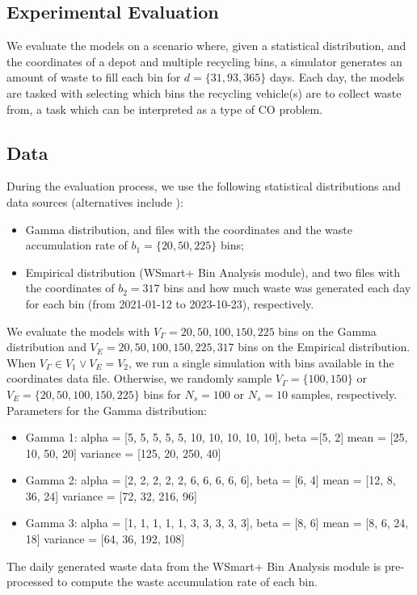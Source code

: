 \documentclass[orivec,runningheads]{llncs}
\begin{document}
\begin{center}
\begin{longtable}
\section{Experimental Evaluation}
We evaluate the models on a scenario where, given a statistical distribution, and the coordinates of a depot and multiple recycling bins, a simulator generates an amount of waste to fill each bin for ${d=\{31, 93, 365\}}$ days. Each day, the models are tasked with selecting which bins the recycling vehicle(s) are to collect waste from, a task which can be interpreted as a type of CO problem.

\subsection{Data}
During the evaluation process, we use the following statistical distributions and data sources (alternatives include \cite{brouwer2023comparison}):
\begin{itemize}
    \item Gamma distribution, and files with the coordinates and the waste accumulation rate of ${b_1=\{20, 50, 225\}}$ bins;
    \item Empirical distribution (WSmart+ Bin Analysis module), and two files with the coordinates of $b_2={317}$ bins and how much waste was generated each day for each bin (from 2021-01-12 to 2023-10-23), respectively.
\end{itemize}
We evaluate the models with ${V_{\Gamma}=20, 50, 100, 150, 225}$ bins on the Gamma distribution and ${V_{E}=20, 50, 100, 150, 225, 317}$ bins on the Empirical distribution. When $V_{\Gamma} \in V_1 \lor V_{E}=V_2$, we run a single simulation with bins available in the coordinates data file. Otherwise, we randomly sample $V_{\Gamma} = \{100, 150\}$ or $V_{E} = \{20, 50, 100, 150, 225\}$ bins for $N_s=100$ or $N_s=10$ samples, respectively.\\
Parameters for the Gamma distribution:
\begin{itemize}
    \item Gamma 1: alpha = [5, 5, 5, 5, 5, 10, 10, 10, 10, 10], beta =[5, 2]
        \subitem mean = [25, 10, 50, 20]
        \subitem variance = [125, 20, 250, 40]
    \item Gamma 2: alpha = [2, 2, 2, 2, 2, 6, 6, 6, 6, 6], beta = [6, 4]
        \subitem mean = [12, 8, 36, 24]
        \subitem variance = [72, 32, 216, 96]
    \item Gamma 3: alpha = [1, 1, 1, 1, 1, 3, 3, 3, 3, 3], beta = [8, 6]
        \subitem mean = [8, 6, 24, 18]
        \subitem variance = [64, 36, 192, 108]
\end{itemize}
The daily generated waste data from the WSmart+ Bin Analysis module is pre-processed to compute the waste accumulation rate of each bin.


\end{longtable}
\end{center}
\end{document}
